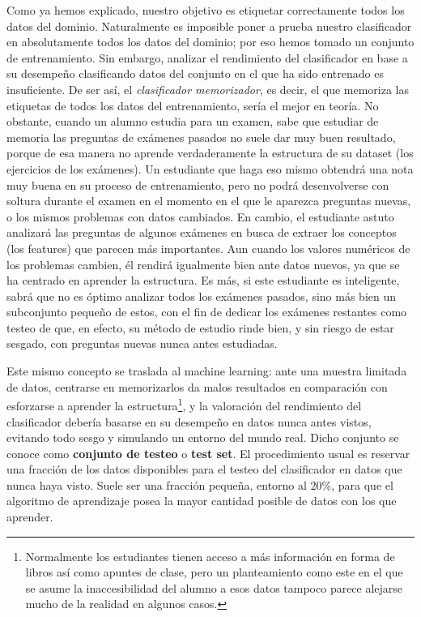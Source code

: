 \documentclass[a4paper, 12pt, oneside]{book}
\begin{document}
Como ya hemos explicado, nuestro objetivo es etiquetar correctamente todos los datos del 
dominio. Naturalmente es imposible poner a prueba nuestro clasificador en absolutamente
todos los datos del dominio; por eso hemos tomado un conjunto de entrenamiento.
Sin embargo, analizar el rendimiento del clasificador en base a su desempeño clasificando
datos del conjunto en el que ha sido entrenado es insuficiente. De ser así, el 
\textit{clasificador memorizador}, es decir, el que memoriza las etiquetas de todos
los datos del entrenamiento, sería el mejor en teoría. No obstante, cuando un alumno
estudia para un examen, sabe que estudiar de memoria las preguntas de exámenes pasados no
suele dar muy buen resultado, porque de esa manera no aprende verdaderamente la estructura 
de su dataset (los ejercicios de los exámenes). Un estudiante que haga eso
mismo obtendrá una nota muy buena en su proceso de entrenamiento, pero no podrá 
desenvolverse con soltura durante el examen en el momento en el que le aparezca preguntas 
nuevas, o los mismos problemas con datos cambiados. 
En cambio, el estudiante astuto analizará las preguntas de algunos exámenes en busca de extraer los conceptos (los features) que parecen más importantes. Aun cuando
los valores numéricos de los problemas cambien, él rendirá igualmente bien ante datos nuevos, ya que se ha centrado en aprender la estructura. Es más, si este estudiante es
inteligente, sabrá que no es óptimo analizar todos los exámenes pasados, sino más bien un 
subconjunto pequeño de estos, con el fin de dedicar los exámenes restantes como testeo de 
que, en efecto, su método de estudio rinde bien, y sin riesgo de estar sesgado, con preguntas nuevas nunca antes estudiadas. 

Este mismo concepto se traslada al machine 
learning: ante una muestra limitada de datos, centrarse en memorizarlos da malos
resultados en comparación con esforzarse a aprender la estructura\footnote{Normalmente los estudiantes tienen acceso a más información en forma de libros así como apuntes de clase, pero un planteamiento como este en el que se asume la inaccesibilidad del alumno a esos datos tampoco parece alejarse mucho de la realidad en algunos casos.}, y la valoración del
rendimiento del clasificador debería basarse en su desempeño en datos nunca antes vistos, 
evitando todo sesgo y simulando un entorno del mundo real. Dicho conjunto se conoce como
\textbf{conjunto de testeo} o \textbf{test set}. El procedimiento usual es reservar
una fracción de los datos disponibles para el testeo del clasificador en datos que nunca
haya visto. Suele ser una fracción pequeña, entorno al 20\%, para que el algoritmo de 
aprendizaje posea la mayor cantidad posible de datos con los que aprender. 
\end{document}
